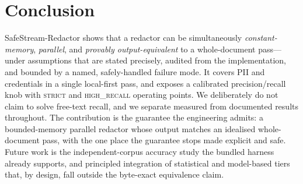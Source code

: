 \documentclass[runningheads]{llncs}
\begin{document}
\section{Conclusion}
\label{sec:conclusion}

SafeStream-Redactor shows that a redactor can be simultaneously
\emph{constant-memory}, \emph{parallel}, and \emph{provably output-equivalent} to
a whole-document pass---under assumptions that are stated precisely, audited from
the implementation, and bounded by a named, safely-handled failure mode. It
covers PII and credentials in a single local-first pass, and exposes a calibrated
precision/recall knob with \textsc{strict} and \textsc{high\_recall} operating
points. We deliberately do not claim to solve free-text recall, and we separate
measured from documented results throughout. The contribution is the guarantee
the engineering admits: a bounded-memory parallel redactor whose output matches
an idealised whole-document pass, with the one place the guarantee stops made
explicit and safe. Future work is the independent-corpus accuracy study the
bundled harness already supports, and principled integration of statistical and
model-based tiers that, by design, fall outside the byte-exact equivalence claim.
\end{document}
